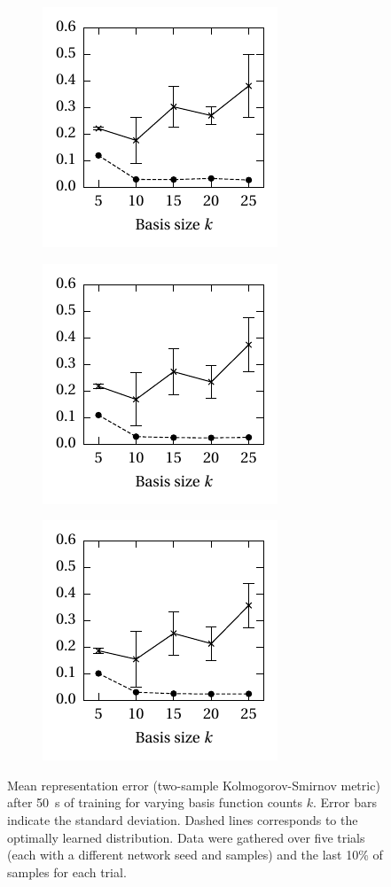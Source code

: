 \documentclass[a4paper,11pt]{article}
\begin{document}
\begin{figure}
	\centering%
 	\begin{subfigure}{0.33\textwidth}%
		\centering%
		\includegraphics{media/net_probability_box_errs.pdf}%
	\end{subfigure}%
	\begin{subfigure}{0.33\textwidth}%
		\centering%
		\includegraphics{media/net_probability_cosine_errs.pdf}%
	\end{subfigure}%
	\begin{subfigure}{0.33\textwidth}%
		\centering%
		\includegraphics{media/net_probability_gaussian_errs.pdf}%
	\end{subfigure}%
	\caption{Mean representation error (two-sample Kolmogorov-Smirnov metric) after \SI{50}{\second} of training for varying basis function counts $k$. Error bars indicate the standard deviation. Dashed lines corresponds to the optimally learned distribution. Data were gathered over five trials (each with a different network seed and samples) and the last 10\% of samples for each trial.}
	\label{fig:net_probability_errs}
\end{figure}
\end{document}
